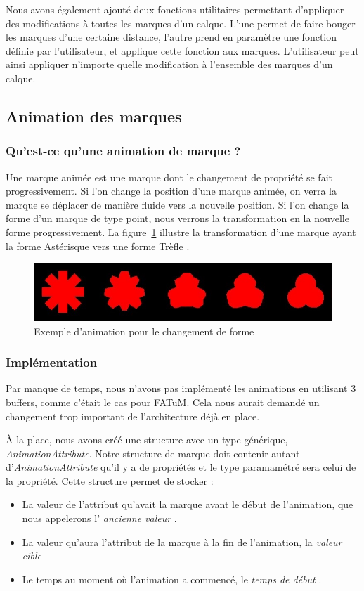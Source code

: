 \documentclass[12pt]{article}
\begin{document}
Nous avons également ajouté deux fonctions utilitaires permettant d'appliquer des modifications à toutes
les marques d'un calque. L'une permet de faire bouger les marques d'une certaine distance, l'autre prend
en paramètre une fonction définie par l'utilisateur, et applique cette fonction aux marques. L'utilisateur
peut ainsi appliquer n'importe quelle modification à l'ensemble des marques d'un calque.

\subsection{Animation des marques}
\subsubsection{Qu'est-ce qu'une animation de marque ?}

Une marque animée est une marque dont le changement de propriété se fait progressivement.
Si l'on change la position d'une marque animée, on verra la marque se déplacer de manière fluide vers la
nouvelle position. Si l'on change la forme d'un marque de type point, nous verrons la transformation en la nouvelle forme progressivement.
La figure~\ref{fig:anim-ex} illustre la transformation d'une marque ayant la forme \og Astérisque \fg{} vers une
forme \og Trèfle \fg{}.

\begin{figure}[htp]
  \centering
  \includegraphics[scale=0.8]{images/anim-exemple}
  \caption{Exemple d'animation pour le changement de forme}
  \label{fig:anim-ex}
\end{figure}

\subsubsection{Implémentation}

Par manque de temps, nous n'avons pas implémenté les animations en utilisant 3 buffers, comme c'était le
cas pour FATuM. Cela nous aurait demandé un changement trop important de l'architecture déjà en place.

À la place, nous avons créé une structure avec un type générique, \textit{AnimationAttribute}.
Notre structure de marque doit contenir autant d'\textit{AnimationAttribute} qu'il y a de propriétés et le
type paramamétré sera celui de la propriété.
Cette structure permet de stocker :
\begin{itemize}
\item La valeur de l'attribut qu'avait la marque avant le début de l'animation, que nous appelerons l'\og
\textit{ancienne valeur} \fg{}.
\item La valeur qu'aura l'attribut de la marque à la fin de l'animation, la \og \textit{valeur cible} \fg{}
\item Le temps au moment où l'animation a commencé, le \og \textit{temps de début} \fg{}.
\end{itemize}
\end{document}
